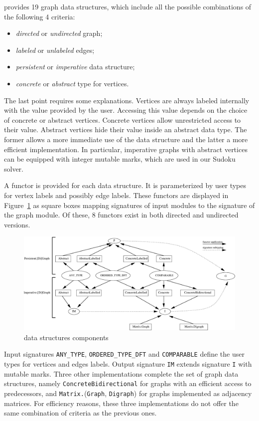 \ocamlgraph provides 19 graph data structures, which include all the
possible combinations of the following 4 criteria:
\begin{itemize}
\item \emph{directed} or \emph{undirected} graph;
\item \emph{labeled} or \emph{unlabeled} edges;
\item \emph{persistent} or \emph{imperative} data structure;
\item \emph{concrete} or \emph{abstract} type for vertices.
\end{itemize}
The last point requires some explanations. Vertices are always labeled
internally with the value provided by the user. Accessing this value
depends on the choice of concrete or abstract vertices.  Concrete
vertices allow unrestricted access to their value.  Abstract vertices
hide their value inside an abstract data type.  The former allows a
more immediate use of the data structure and the latter a more
efficient implementation. In particular, imperative graphs with
abstract vertices can be equipped with integer mutable marks, which
are used in our Sudoku solver.

A functor is provided for each data structure. It is parameterized by
user types for vertex labels and possibly edge labels. These functors
are displayed in Figure~\ref{XII:fig:interfaces} as square boxes mapping
signatures of input modules to the signature of the graph module.
Of these, 8 functors exist in both directed and undirected versions.
\begin{figure}
  \centering
  \includegraphics[width=\textwidth]{interface.eps} 
  \caption{\ocamlgraph data structures components}\label{XII:fig:interfaces}
\end{figure}
Input signatures \texttt{ANY\_TYPE}, \texttt{ORDERED\_TYPE\_DFT} and
\texttt{COMPARABLE} define the user types for vertices and edges
labels. Output signature \texttt{IM} extends signature \texttt{I} with
mutable marks. Three other implementations complete the set of graph
data structures, namely \texttt{ConcreteBidirectional} for graphs with
an efficient access to predecessors, and
\texttt{Matrix.}(\texttt{Graph}, \texttt{Digraph}) for graphs
implemented as adjacency matrices. For efficiency reasons, these three
implementations do not offer the same combination of criteria as the
previous ones.

